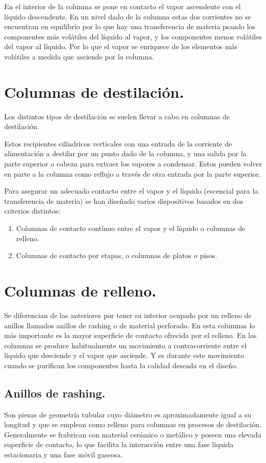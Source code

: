 \documentclass[11pt,openany]{book}
\begin{document}
En el interior de la columna se pone en contacto el vapor ascendente con el líquido descendente. 
En un nivel dado de la columna estas dos corrientes no se encuentran en equilibrio por lo que hay 
una transferencia de materia psando los componentes más volátiles del líquido al vapor, y los 
componentes menos volátiles del vapor al líquido. Por lo que el vapor se enriquece de los 
elementos más volátiles a medida que asciende por la columna.

\section {Columnas de destilación.}

Los distintos tipos de destilación se suelen llevar a cabo en columnas de destilación.

Estos recipientes cilíndricos verticales con una entrada de la corriente de alimentación a 
destilar por un punto dado de la columna, y una salida por la parte superior o cabeza para extraer 
los vapores a condensar. Estos pueden volver en parte a la columna como reflujo a través de otra entrada por la 
parte superior.

Para asegurar un adecuado contacto entre el vapor y el líquido (escencial para la transferencia de materia) se han 
diseñado varios dispositivos basados en dos criterios distintos:
\begin{enumerate}
\item Columnas de contacto contínuo entre el vapor y el líquido o columnas de relleno.
\item Columnas de contacto por etapas, o columnas de platos o pisos.
\end{enumerate}
\section{Columnas de relleno.}
Se diferencian de las anteriores por tener su interior ocupado por un relleno de anillos
llamados anillos de rashing o de material perforado.
En esta columnas lo más importante es la mayor superficie de contacto ofrecida por el relleno.
En las columnas se produce habitualmente un movimiento a contracorriente entre el líquido que 
desciende y el vapor que asciende. Y es durante este movimiento cuando se purifican los 
componentes hasta la calidad deseada en el diseño.
\subsection{Anillos de rashing.}
Son piezas de geometría tubular cuyo diámetro es aproximadamente igual a su longitud y que se 
emplean como relleno para columnas en procesos de destilación.
Generalmente se frabrican con material cerámico o metálico y poseen una elevada superficie de 
contacto, lo que facilita la interacción entre una fase líquida estacionaria y una fase móvil gaseosa.
\end{document}
